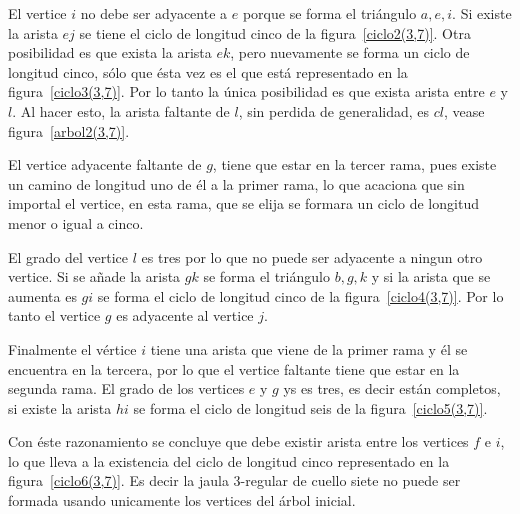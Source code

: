 \documentclass[11pt]{book}
\theoremstyle{definition}
\begin{document}
El vertice $i$ no debe ser adyacente a $e$ porque se forma el
triángulo $a, e, i$. Si existe la arista $ej$ se
tiene el ciclo de longitud cinco de la figura~\ref{ciclo2(3,7)}. Otra
posibilidad es que exista la arista $ek$, pero nuevamente se forma un
ciclo de longitud cinco, sólo que ésta vez es el que está representado
en la figura~\ref{ciclo3(3,7)}. Por lo tanto la única posibilidad es
que exista arista entre $e$ y $l$. Al hacer esto, la arista faltante de $l$,
sin perdida de generalidad, es $cl$, vease figura~\ref{arbol2(3,7)}.


El vertice adyacente faltante de $g$, tiene que estar en la tercer
rama, pues existe un camino de longitud uno de él a la primer rama, lo
que acaciona que sin importal el vertice, en esta rama, que se elija
se formara un ciclo de longitud menor o igual a cinco.

El grado del vertice $l$ es tres por lo que no puede ser adyacente a
ningun otro vertice. Si se añade la arista $gk$ se forma el triángulo
$b,g,k$ y si la arista que se aumenta es $gi$ se forma el ciclo de
longitud cinco de la
figura~\ref{ciclo4(3,7)}. Por lo tanto el vertice $g$ es adyacente al
vertice $j$.


Finalmente el vértice $i$ tiene una arista que viene de la primer rama
y él se encuentra en la tercera, por lo que el vertice faltante tiene
que estar en la segunda
rama. El grado de los vertices $e$ y $g$ ys es tres, es decir están
completos, si existe la arista $hi$ se forma el ciclo de
longitud seis de la figura~\ref{ciclo5(3,7)}.


Con éste razonamiento se concluye que debe existir arista entre los
vertices $f$ e $i$, lo que lleva a la existencia del ciclo de longitud cinco
representado en la figura~\ref{ciclo6(3,7)}. Es decir la jaula
$3$-regular de cuello siete no
puede ser formada usando unicamente los vertices del árbol inicial.



\begin{figure}
  \centering
  \caption{} \label{ciclo1(3,7)}
\end{figure}
\end{document}
